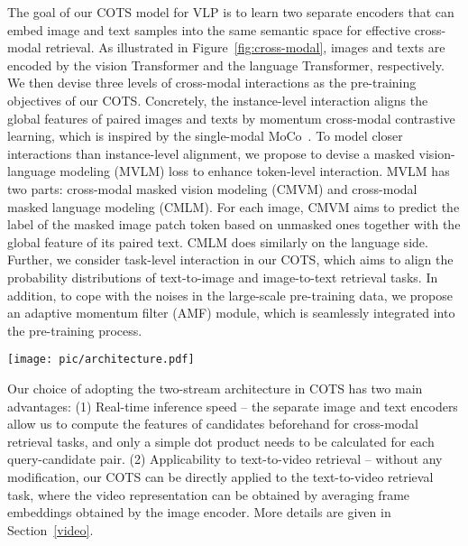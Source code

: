 \documentclass[10pt,twocolumn,letterpaper]{article}
\begin{document}
The goal of our COTS model for VLP is to learn two separate encoders that can embed image and text samples into the same semantic space for effective cross-modal retrieval. As illustrated in Figure~\ref{fig:cross-modal}, images and texts are encoded by the vision Transformer and the language Transformer, respectively. We then devise three levels of cross-modal interactions as the pre-training objectives of our COTS. Concretely, the instance-level interaction aligns the global features of paired images and texts by momentum cross-modal contrastive learning, which is inspired by the single-modal MoCo~\cite{he2020momentum}. To model closer interactions than instance-level alignment, we propose to devise a masked vision-language modeling (MVLM) loss to enhance token-level interaction. MVLM has two parts: cross-modal masked vision modeling (CMVM) and cross-modal masked language modeling (CMLM). For each image, CMVM aims to predict the label of the masked image patch token based on unmasked ones together with the global feature of its paired text. CMLM does similarly on the language side. Further, we consider task-level interaction in our COTS, which aims to align the probability distributions of text-to-image and image-to-text retrieval tasks. In addition, to cope with the noises in the large-scale pre-training data, we propose an adaptive momentum filter (AMF) module, which is seamlessly integrated into the pre-training process.

\begin{figure*}[t]
    \centering
    \texttt{[image: pic/architecture.pdf]}
    \vspace{-0.1in}
    \caption{
    A schematic illustration of the proposed COTS for cross-modal retrieval.
    }
    \label{fig:cross-modal}
    \vspace{-0.1in}
\end{figure*}

Our choice of adopting the two-stream architecture in COTS has two main advantages: (1) Real-time inference speed -- the separate image and text encoders allow us to compute the features of candidates beforehand for cross-modal retrieval tasks, and only a simple dot product needs to be calculated for each query-candidate pair. (2) Applicability to text-to-video retrieval -- without any modification, our COTS can be directly applied to the text-to-video retrieval task, where the video representation can be obtained by averaging frame embeddings obtained by the image encoder. More details are given in Section~\ref{video}.
\end{document}
